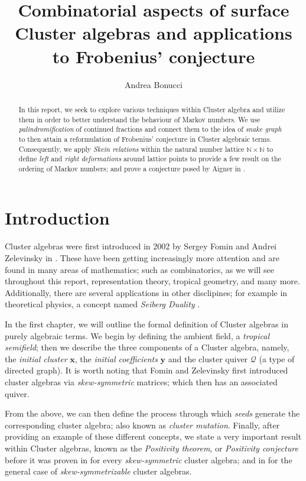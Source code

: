 \documentclass[12pt,vu]{adammath}
\title{Combinatorial aspects of surface Cluster algebras and applications to Frobenius' conjecture}
\author[a.bonucci@student.vu.nl, 2694276]{Andrea Bonucci}
\theoremstyle{theorem}
\theoremstyle{corollary}
\theoremstyle{conjecture}
\theoremstyle{proposition}
\theoremstyle{definition}
\theoremstyle{remark}
\begin{document}

\maketitle

\begin{abstract}
    In this report, we seek to explore various techniques within Cluster algebra and utilize them in order to better understand the behaviour of Markov numbers. We use \emph{palindromification} of continued fractions and connect them to the idea of \emph{snake graph} to then attain a reformulation of Frobenius' conjecture in Cluster algebraic terms. Consequently, we apply \emph{Skein relations} within the natural number lattice $\mathbb{N}\times \mathbb{N}$ to define \emph{left} and \emph{right deformations} around lattice points to provide a few result on the ordering of Markov numbers; and prove a conjecture posed by Aigner in \cite{A}. 
\end{abstract}
\newpage 
\tableofcontents
\newpage
\chapter*{Introduction}
Cluster algebras were first introduced in 2002 by Sergey Fomin and Andrei Zelevinsky in \cite{FZ1}. These have been getting increasingly more attention and are found in many areas of mathematics; such as combinatorics, as we will see throughout this report, representation theory, tropical geometry, and many more. Additionally, there are several applications in other disclipines; for example in theoretical physics, a concept named \emph{Seiberg Duality} \cite{Bao}. 

In the first chapter, we will outline the formal definition of Cluster algebras in purely algebraic terms. We begin by defining the ambient field, a \emph{tropical semifield}; then we describe the three components of a Cluster algebra, namely, the \emph{initial cluster} $\mathbf{x}$, the \emph{initial coefficients} $\mathbf{y}$ and the cluster quiver $\mathcal{Q}$ (a type of directed graph). It is worth noting that Fomin and Zelevinsky first introduced cluster algebras via \emph{skew-symmetric} matrices; which then has an associated quiver. 

From the above, we can then define the process through which \emph{seeds} generate the corresponding cluster algebra; also known as \emph{cluster mutation}. Finally, after providing an example of these different concepts, we state a very important result within Cluster algebras, known as the \emph{Positivity theorem}, or \emph{Positivity conjecture} before it was proven in \cite{LS} for every \emph{skew-symmetric} cluster algebra; and in \cite{GHKK} for the general case of \emph{skew-symmetrizable} cluster algebras.
\end{document}
